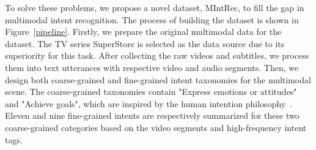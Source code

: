 \documentclass[sigconf,camera-ready]{acmart}
\begin{document}
To solve these problems, we propose a novel dataset, MIntRec, to fill the gap in multimodal intent recognition. The process of building the dataset is shown in Figure~\ref{pipeline}. Firstly, we prepare the original multimodal data for the dataset. The TV series SuperStore is selected as the data source due to its superiority for this task. After collecting the raw videos and subtitles, we process them into text utterances with respective video and audio segments. Then, we design both coarse-grained and fine-grained intent taxonomies for the multimodal scene. The coarse-grained taxonomies contain "Express emotions or attitudes" and "Achieve goals", which are inspired by the human intention philosophy~\cite{bratman1988intention}. Eleven and nine fine-grained intents are respectively summarized for these two coarse-grained categories based on the video segments and high-frequency intent tags. 
\end{document}
